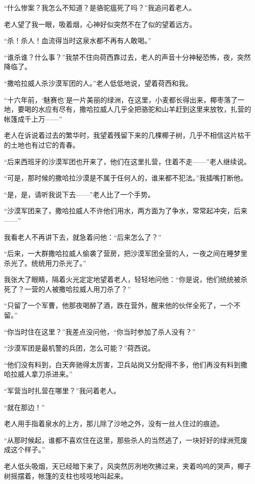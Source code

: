 \par “什么惨案？我怎么不知道？是骆驼瘟死了吗？”我追问着老人。
\par 老人望了我一眼，吸着烟，心神好似突然不在了似的望着远方。
\par “杀！杀人！血流得当时这泉水都不再有人敢喝。”
\par “谁杀谁？什么事？”我禁不住向荷西靠过去，老人的声音十分神秘恐怖，夜，突然降临了。
\par “撒哈拉威人杀沙漠军团的人。”老人低低地说，望着荷西和我。
\par “十六年前，‘魅赛也’是一片美丽的绿洲，在这里，小麦都长得出来，椰枣落了一地，要喝的水应有尽有，撒哈拉威人几乎全把骆驼和山羊赶到这里来放牧，扎营的帐篷成千上万——”
\par 老人在诉说着过去的繁华时，我望着残留下来的几棵椰子树，几乎不相信这片枯干的土地也有过它的青春。
\par “后来西班牙的沙漠军团也开来了，他们在这里扎营，住着不走——”老人继续说。
\par “可是，那时候的撒哈拉沙漠是不属于任何人的，谁来都不犯法。”我插嘴打断他。
\par “是，是，请听我说下去——”老人比了一个手势。
\par “沙漠军团来了，撒哈拉威人不许他们用水，两方面为了争水，常常起冲突，后来——”
\par 我看老人不再讲下去，就急着问他：“后来怎么了？”
\par “后来，一大群撒哈拉威人偷袭了营房，把沙漠军团全营的人，一夜之间在睡梦里杀光了。统统用刀杀光了。”
\par 我张大了眼睛，隔着火光定定地望着老人，轻轻地问他：“你是说，他们统统被杀死了？一营的人被撒哈拉威人用刀杀了？”
\par “只留了一个军曹，他那夜喝醉了酒，跌在营外，醒来他的伙伴全死了，一个不留。”
\par “你当时住在这里？”我差点没问他，“你当时参加了杀人没有？”
\par “沙漠军团是最机警的兵团，怎么可能？”荷西说。
\par “他们没有料到，白天奔驰得太厉害，卫兵站岗又分配得不多，他们再没有料到撒哈拉威人拿刀杀进来。”
\par “军营当时扎营在哪里？”我问着老人。
\par “就在那边！”
\par 老人用手指着泉水的上方，那儿除了沙地之外，没有一丝人住过的痕迹。
\par “从那时候起，谁都不喜欢住在这里，那些杀人的当然逃了，一块好好的绿洲荒废成这个样子。”
\par 老人低头吸烟，天已经暗下来了，风突然厉冽地吹拂过来，夹着呜呜的哭声，椰子树摇摆着，帐篷的支柱也吱吱地叫起来。
